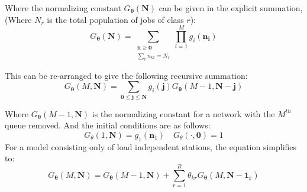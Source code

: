 Where the normalizing constant \(G_{\boldsymbol{\theta}}(\mathbf{N})\) can be given in the explicit summation, (Where \(N_r\) is the total population of jobs of class \(r\)):
\[G_{\boldsymbol{\theta}}(\mathbf{N}) = \sum_{\substack{\mathbf{n} \geq \mathbf{0}\\ \sum_r{n_{kr}} = N_r}} \prod_{i=1}^M g_i(\mathbf{n_i})\]

This can be re-arranged to give the following recursive summation:
\[ G_{\boldsymbol{\theta}}(M, \mathbf{N}) =  \sum_{\mathbf{0} \leq \mathbf{j} \leq \mathbf{N}} g_i(\mathbf{j}) G_{\boldsymbol{\theta}}(M-1, \mathbf{N-j})\]

Where \(G_{\boldsymbol{\theta}}(M-1, \mathbf{N})\) is the normalizing constant for a network with the \(M^{th}\) queue removed. And the initial conditions are as follows:
\[G_{\theta}(1,\mathbf{N}) = g_1(\mathbf{n}_1) \quad G_{\theta}(\cdot,\mathbf{0}) = 1\]
For a model consisting only of load independent stations, the equation simplifies to:
\[G_{\boldsymbol{\theta}}(M, \mathbf{N}) = G_{\boldsymbol{\theta}}(M-1, \mathbf{N}) + \sum_{r=1}^R \theta_{kr} G_{\boldsymbol{\theta}}(M, \mathbf{N-1_r}) \]

